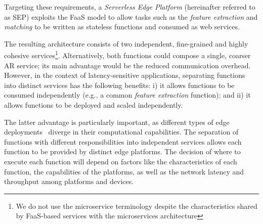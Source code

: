 Targeting these requirements, a \textit{Serverless Edge Platform} (hereinafter referred to as SEP) exploits the FaaS model to allow tasks such as the \textit{feature extraction} and \textit{matching} to be written as stateless functions and consumed as web services. 

The resulting architecture consists of two independent, fine-grained and highly cohesive services\footnote{We do not use the microservice terminology despite the  characteristics shared by FaaS-based services with the microservices architecture}. 
Alternatively, both functions could compose a single, coarser AR service; its main advantage would be the reduced communication overhead. However, in the context of latency-sensitive applications, separating functions into distinct services has the following benefits:
i) it allows functions to be consumed independently 
(e.g., a common \textit{feature extraction} function); and ii) it allows functions to be deployed and scaled independently.%


The latter advantage is particularly important, as different types of edge deployments~\cite{Satyanarayanan:2009,Taleb:2013,Liu:2014}
diverge in their computational capabilities. 
The separation of functions with different responsibilities 
into independent services allows each function to be provided by distinct edge platforms. 
The decision of where to execute each function will depend on factors like the characteristics of each function, the capabilities of the platforms, as well as the network latency and throughput among platforms and devices. 

